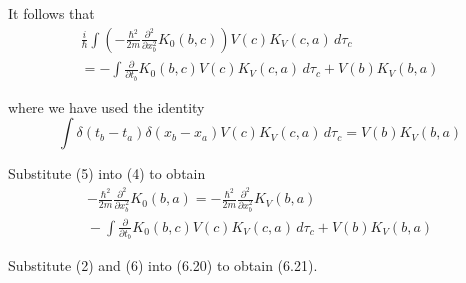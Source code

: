 It follows that
\begin{multline*}
\frac{i}{\hbar}\int\left(-\frac{\hbar^2}{2m}\frac{\partial^2}{\partial x_b^2}K_0(b,c)\right)
V(c)K_V(c,a)\,d\tau_c
\\
=-\int\frac{\partial}{\partial t_b}K_0(b,c)V(c)K_V(c,a)\,d\tau_c
+V(b)K_V(b,a)
\tag{5}
\end{multline*}

where we have used the identity
\begin{equation*}
\int\delta(t_b-t_a)\delta(x_b-x_a)V(c)K_V(c,a)\,d\tau_c
=V(b)K_V(b,a)
\end{equation*}

Substitute (5) into (4) to obtain
\begin{multline*}
-\frac{\hbar^2}{2m}\frac{\partial^2}{\partial x_b^2}K_0(b,a)
=-\frac{\hbar^2}{2m}\frac{\partial^2}{\partial x_b^2}K_V(b,a)
\\
{}-\int\frac{\partial}{\partial t_b}K_0(b,c)V(c)K_V(c,a)\,d\tau_c
+V(b)K_V(b,a)
\tag{6}
\end{multline*}

Substitute (2) and (6) into (6.20) to obtain (6.21).


